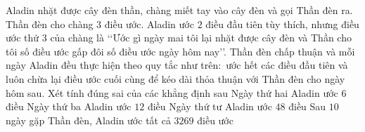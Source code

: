 \begin{ex}%
	Aladin nhặt được cây đèn thần, chàng miết tay vào cây đèn và gọi Thần đèn ra. Thần đèn cho chàng $3$ điều ước. Aladin ước $2$ điều đầu tiên tùy thích, nhưng điều ước thứ $3$ của chàng là \lq\lq Ước gì ngày mai tôi lại nhặt được cây đèn và Thần cho tôi số điều ước gấp đôi số điều ước ngày hôm nay\rq\rq. Thần đèn  chấp thuận và mỗi ngày Aladin đều thực hiện theo quy tắc như trên$\colon$ ước hết các điều đầu tiên và luôn chừa lại điều ước cuối cùng để kéo dài thỏa thuận với Thần đèn cho ngày hôm sau.
	Xét tính đúng sai của các khẳng định sau 
	\choiceTF 
		 {\True Ngày thứ hai Aladin ước $6$ điều}
		{\True Ngày thứ ba Aladin ước $12$ điều} 
		{Ngày thứ tư Aladin ước $48$  điều}
		{Sau $10$ ngày gặp Thần đèn, Aladin ước  tất cả $3269$ điều ước}
\end{ex}

